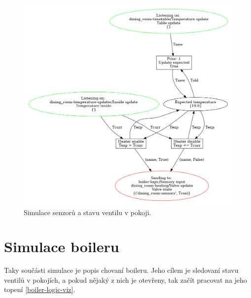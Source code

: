 \begin{figure}[htb]
  \centering
  \includegraphics[width=\textwidth]{obrazky-figures/room-sensors.png}
  \caption{Simulace senzorů a stavu ventilu v pokoji.}
  \label{sensor-viz}
\end{figure}


\section{Simulace boileru}

Taky součásti simulace je popis chovaní boileru. Jeho cílem je sledovaní stavu ventilů v pokojích, a pokud nějaký z nich je otevřeny, tak začít pracovat na jeho topení \ref{boiler-logic-viz}.

